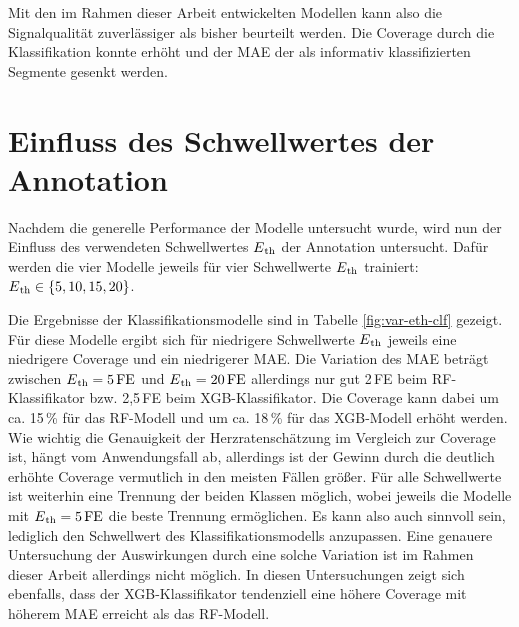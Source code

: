  Mit den im Rahmen dieser Arbeit entwickelten Modellen kann also die Signalqualität zuverlässiger als bisher beurteilt werden. Die Coverage durch die Klassifikation konnte erhöht und der \ac{MAE} der als informativ klassifizierten Segmente gesenkt werden.

\section{Einfluss des Schwellwertes der Annotation}

Nachdem die generelle Performance der Modelle untersucht wurde, wird nun der Einfluss des verwendeten Schwellwertes $E\textsubscript{th}$ der Annotation untersucht. Dafür werden die vier Modelle jeweils für vier Schwellwerte $E\textsubscript{th}$ trainiert: $E\textsubscript{th} \in \{5, 10, 15, 20\}$.

Die Ergebnisse der Klassifikationsmodelle sind in Tabelle \ref{fig:var-eth-clf} gezeigt. Für diese Modelle ergibt sich für niedrigere Schwellwerte $E\textsubscript{th}$ jeweils eine niedrigere Coverage und ein niedrigerer \ac{MAE}. Die Variation des \ac{MAE} beträgt zwischen $E\textsubscript{th}= 5\,\si{FE}$ und $E\textsubscript{th} = 20\,\si{FE}$ allerdings nur gut 2\,\si{FE} beim \ac{RF}-Klassifikator bzw. 2,5\,\si{FE} beim \ac{XGB}-Klassifikator. Die Coverage kann dabei um ca. 15\,\% für das \ac{RF}-Modell und um ca. 18\,\% für das \ac{XGB}-Modell erhöht werden. Wie wichtig die Genauigkeit der Herzratenschätzung im Vergleich zur Coverage ist, hängt vom Anwendungsfall ab, allerdings ist der Gewinn durch die deutlich erhöhte Coverage vermutlich in den meisten Fällen größer. Für alle Schwellwerte ist weiterhin eine Trennung der beiden Klassen möglich, wobei jeweils die Modelle mit $E\textsubscript{th}= 5\text{\,}\si{FE}$ die beste Trennung ermöglichen. Es kann also auch sinnvoll sein, lediglich den Schwellwert des Klassifikationsmodells anzupassen. Eine genauere Untersuchung der Auswirkungen durch eine solche Variation ist im Rahmen dieser Arbeit allerdings nicht möglich. In diesen Untersuchungen zeigt sich ebenfalls, dass der \ac{XGB}-Klassifikator tendenziell eine höhere Coverage mit höherem \ac{MAE} erreicht als das \ac{RF}-Modell.

